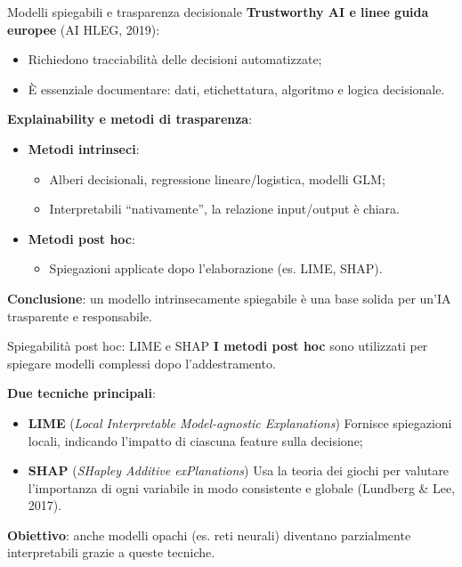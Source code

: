 \documentclass{beamer}
\begin{document}
\begin{frame}{Modelli spiegabili e trasparenza decisionale}
\small
\textbf{Trustworthy AI e linee guida europee} (AI HLEG, 2019):
\begin{itemize}
    \item Richiedono tracciabilità delle decisioni automatizzate;
    \item È essenziale documentare: dati, etichettatura, algoritmo e logica decisionale.
\end{itemize}

\vspace{0.2cm}
\textbf{Explainability e metodi di trasparenza}:
\begin{itemize}
    \item \textbf{Metodi intrinseci}:
    \begin{itemize}
        \item Alberi decisionali, regressione lineare/logistica, modelli GLM;
        \item Interpretabili “nativamente”, la relazione input/output è chiara.
    \end{itemize}
    \item \textbf{Metodi post hoc}:
    \begin{itemize}
        \item Spiegazioni applicate dopo l’elaborazione (es. LIME, SHAP).
    \end{itemize}
\end{itemize}

\vspace{0.2cm}
\textbf{Conclusione}: un modello intrinsecamente spiegabile è una base solida per un’IA trasparente e responsabile.
\end{frame}
%
%
\begin{frame}{Spiegabilità post hoc: LIME e SHAP}
\small
\textbf{I metodi post hoc} sono utilizzati per spiegare modelli complessi dopo l’addestramento.

\vspace{0.3cm}
\textbf{Due tecniche principali}:
\begin{itemize}
    \item \textbf{LIME} (\textit{Local Interpretable Model-agnostic Explanations})  
    Fornisce spiegazioni locali, indicando l’impatto di ciascuna feature sulla decisione;
    
    \item \textbf{SHAP} (\textit{SHapley Additive exPlanations})  
    Usa la teoria dei giochi per valutare l’importanza di ogni variabile in modo consistente e globale (Lundberg \& Lee, 2017).
\end{itemize}

\vspace{0.3cm}
\textbf{Obiettivo}: anche modelli opachi (es. reti neurali) diventano parzialmente interpretabili grazie a queste tecniche.
\end{frame}
%
\end{document}
